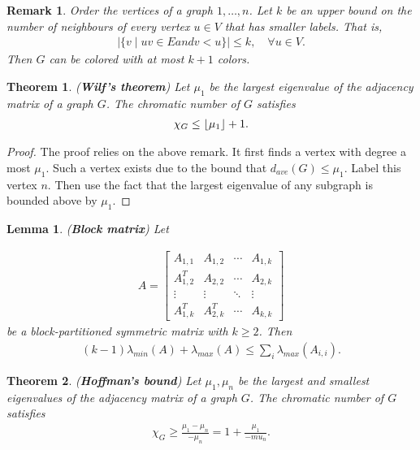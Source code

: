 \documentclass[]{article}
\newtheorem{theorem}{Theorem}[section]
\newtheorem{lemma}{Lemma}[section]
\newtheorem{remark}{Remark}[section]
\DeclarePairedDelimiter\floor{\lfloor}{\rfloor}
\begin{document}
	\begin{remark}
		Order the vertices of a graph $1,\dots,n$. Let $k$ be an upper bound on the number of neighbours of every vertex $u \in V$ that has smaller labels. That is, 
		\begin{align*}
		|\{v \mid uv \in E and v < u\}| \le k, \quad \forall u \in V.
		\end{align*}
		Then $G$ can be colored with at most $k+1$ colors. 
	\end{remark}
	
	\begin{theorem} (\textbf{Wilf's theorem})
		Let $\mu_1$ be the largest eigenvalue of the adjacency matrix of a graph $G$. The chromatic number of $G$ satisfies 
		\begin{align*}
		\chi_G \le \floor*{\mu_1} + 1.
		\end{align*}
	\end{theorem}
	\begin{proof}
		The proof relies on the above remark. It first finds a vertex with degree a most $\mu_1$. Such a vertex exists due to the bound that $d_{ave}(G) \le \mu_1$. Label this vertex $n$. Then use the fact that the largest eigenvalue of any subgraph is bounded above by $\mu_1$.
	\end{proof}
	
	
	\begin{lemma} (\textbf{Block matrix})
		Let 
		
		\begin{align*}
		A = 
		\begin{bmatrix}
		A_{1,1} & A_{1,2} & \cdots & A_{1,k} \\
		A_{1,2}^T & A_{2,2} & \cdots & A_{2,k} \\
		\vdots & \vdots & \ddots & \vdots \\
		A_{1,k}^T & A_{2,k}^T & \cdots & A_{k,k}
		\end{bmatrix}
		\end{align*}
		be a block-partitioned symmetric matrix with $k \ge 2$. Then 
		\begin{align*}
		(k-1) \lambda_{min}(A) + \lambda_{max}(A) \le \sum_i \lambda_{max}(A_{i,i}).
		\end{align*}
	\end{lemma}
	
	
	\begin{theorem} (\textbf{Hoffman's bound})
		Let $\mu_1,\mu_n$ be the largest and smallest eigenvalues of the adjacency matrix of a graph $G$. The chromatic number of $G$ satisfies 
		\begin{align*}
		\chi_G \ge \frac{\mu_1 - \mu_n}{-\mu_n} = 1 + \frac{\mu_1}{-mu_n}.
		\end{align*}
	\end{theorem}
	
\end{document}
